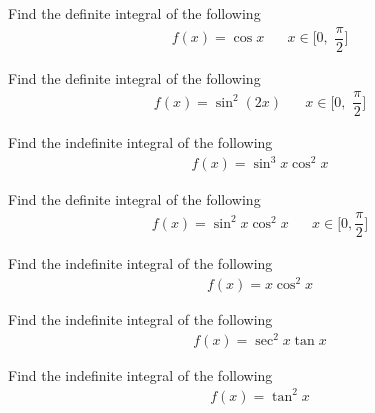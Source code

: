 \begin{exercise}
Find the definite integral of the following
\begin{align*}
    f(x) = \cos x \hspace{20pt} x \in \Big[0, \hspace{4pt} \dfrac{\pi}{2} \Big]
\end{align*}
\end{exercise}

\begin{exercise}
Find the definite integral of the following
\begin{align*}
    f(x) = \sin^{2}(2x) \hspace{20pt} x \in \Big[0, \hspace{4pt} \dfrac{\pi}{2} \Big]
\end{align*}
\end{exercise}

\begin{exercise}
Find the indefinite integral of the following
\begin{align*}
    f(x) = \sin^{3} x \cos^{2} x
\end{align*}
\end{exercise}

\begin{exercise}
Find the definite integral of the following
\begin{align*}
    f(x) = \sin^{2} x \cos^{2} x \hspace{20pt} x \in \Big[0, \dfrac{\pi}{2} \Big]
\end{align*}
\end{exercise}

\begin{exercise}
Find the indefinite integral of the following
\begin{align*}
    f(x) = x \cos^{2} x
\end{align*}
\end{exercise}

\begin{exercise}
Find the indefinite integral of the following
\begin{align*}
    f(x) = \sec^{2} x \tan x
\end{align*}
\end{exercise}

\begin{exercise}
Find the indefinite integral of the following
\begin{align*}
    f(x) = \tan^{2} x 
\end{align*}
\end{exercise}

